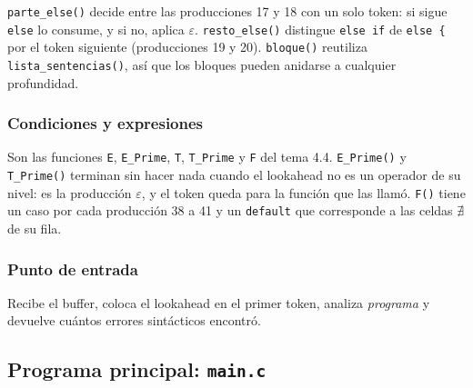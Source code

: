\documentclass[12pt]{article}
\newcommand{\cmd}[1]{\texttt{\small #1}}
\newcommand{\nt}[1]{\textit{#1}}
\begin{document}
\cmd{parte\_else()} decide entre las producciones 17 y 18 con un solo token: si sigue \cmd{else}
lo consume, y si no, aplica $\varepsilon$. \cmd{resto\_else()} distingue \cmd{else if} de
\cmd{else \{} por el token siguiente (producciones 19 y 20). \cmd{bloque()} reutiliza
\cmd{lista\_sentencias()}, así que los bloques pueden anidarse a cualquier profundidad.

\subsubsection*{Condiciones y expresiones}



Son las funciones \cmd{E}, \cmd{E\_Prime}, \cmd{T}, \cmd{T\_Prime} y \cmd{F} del tema 4.4.
\cmd{E\_Prime()} y \cmd{T\_Prime()} terminan sin hacer nada cuando el lookahead no es un
operador de su nivel: es la producción $\varepsilon$, y el token queda para la función que las
llamó. \cmd{F()} tiene un caso por cada producción 38 a 41 y un \cmd{default} que corresponde a
las celdas $\nexists$ de su fila.

\subsubsection*{Punto de entrada}



Recibe el buffer, coloca el lookahead en el primer token, analiza \nt{programa} y devuelve
cuántos errores sintácticos encontró.

\subsection{Programa principal: \texttt{main.c}}


\end{document}
